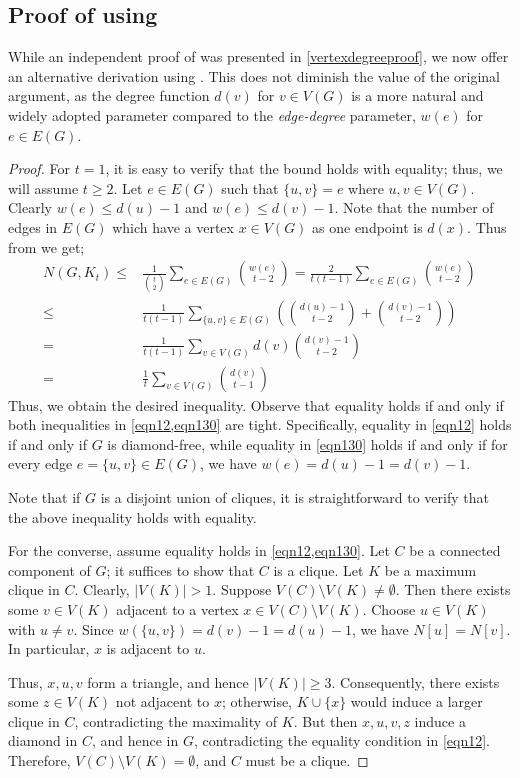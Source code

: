 \documentclass[pdflatex,sn-basic,Numbered]{sn-jnl}
\begin{document}
\subsection{Proof of  using } While an independent proof of  was presented in \cref{vertexdegreeproof}, we now offer an alternative derivation using . This does not diminish the value of the original argument, as the degree function $d(v)$ for $v \in V(G)$ is a more natural and widely adopted parameter compared to the \textit{edge-degree} parameter, $w(e)$ for $e \in E(G)$.
 \begin{proof}
        For $ t=1$, it is easy to verify that the bound holds with equality; thus, we will assume $ t\geq 2$. Let $e \in E(G)$ such that $\{u,v\} = e$ where $u,v \in V(G)$. Clearly $w(e) \leq d(u) -1$ and $w(e) \leq d(v) -1$. Note that the number of edges in $E(G)$ which have a vertex $x \in V(G)$ as one endpoint is $d(x)$. Thus from  we get;
        \begin{align}
            N(G,K_t) \leq & \frac{1}{{t \choose 2}}\sum_{e \in E(G)}{w(e) \choose t-2} = \frac{2}{t(t-1)}\sum_{e \in E(G)}{w(e) \choose t-2}\label{eqn12}\\
            \leq & \frac{1}{t(t-1)}\sum_{\{u,v\} \in E(G)}\left({d(u) -1 \choose t-2}  + {d(v)-1 \choose t-2}\right)\label{eqn130}\\
            = & \frac{1}{t(t-1)}\sum_{v \in V(G)}d(v){d(v)-1\choose t-2}\nonumber\\
            = & \frac{1}{t}\sum_{v \in V(G)}{d(v) \choose t-1}\nonumber
        \end{align}
        Thus, we obtain the desired inequality. Observe that equality holds if and only if both inequalities in \cref{eqn12,eqn130} are tight. Specifically, equality in \cref{eqn12} holds if and only if $G$ is diamond-free, while equality in \cref{eqn130} holds if and only if for every edge $e = \{u, v\} \in E(G)$, we have $w(e) = d(u) - 1 = d(v) - 1$. 

        Note that if $G$ is a disjoint union of cliques, it is straightforward to verify that the above inequality holds with equality.  

        For the converse, assume equality holds in \cref{eqn12,eqn130}. Let $C$ be a connected component of $G$; it suffices to show that $C$ is a clique. Let $K$ be a maximum clique in $C$. Clearly, $|V(K)| > 1$. Suppose $V(C) \setminus V(K) \neq \emptyset$. Then there exists some $v \in V(K)$ adjacent to a vertex $x \in V(C) \setminus V(K)$. Choose $u \in V(K)$ with $u \neq v$. Since $w(\{u,v\}) = d(v)-1 = d(u)-1$, we have $N[u] = N[v]$. In particular, $x$ is adjacent to $u$.  

        Thus, $x,u,v$ form a triangle, and hence $|V(K)| \geq 3$. Consequently, there exists some $z \in V(K)$ not adjacent to $x$; otherwise, $K \cup \{x\}$ would induce a larger clique in $C$, contradicting the maximality of $K$. But then $x,u,v,z$ induce a diamond in $C$, and hence in $G$, contradicting the equality condition in \cref{eqn12}. Therefore, $V(C) \setminus V(K) = \emptyset$, and $C$ must be a clique.
     \end{proof}
\end{document}
